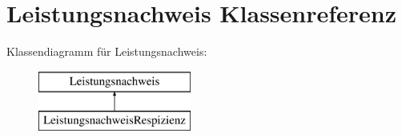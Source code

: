 \hypertarget{class_leistungsnachweis}{}\section{Leistungsnachweis Klassenreferenz}
\label{class_leistungsnachweis}
Klassendiagramm für Leistungsnachweis\+:\begin{figure}[H]
\begin{center}
\leavevmode
\includegraphics[height=2.000000cm]{class_leistungsnachweis}
\end{center}
\end{figure}
